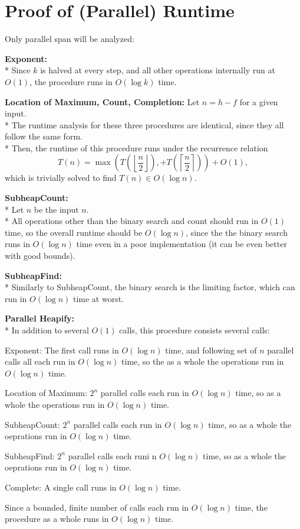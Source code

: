 \documentclass[letterpaper, reqno, 11pt]{article}
\begin{document}
\section*{Proof of (Parallel) Runtime}
Only parallel span will be analyzed:
\begin{description}
	\item{\bf Exponent:}\\*
		Since $k$ is halved at every step, and all other operations internally run at $O(1)$,
		the procedure runs in $O(\log k)$ time.
	\item{\bf Location of Maximum, Count, Completion:}
		Let $n=h-f$ for a given input.\\*
		The runtime analysis for these three procedures are identical,
		since they all follow the same form.\\*
		Then, the runtime of this procedure runs under the recurrence relation
		$$T(n)=\max\left(T\left(\left\lfloor\frac{n}{2}\right\rfloor\right),
		+T\left(\left\lceil\frac{n}{2}\right\rceil\right)\right)+O(1),$$
		which is trivially solved to find $T(n)\in O(\log n)$.
	\item{\bf SubheapCount:}\\*
		Let $n$ be the input $n$.\\*
		All operations other than the binary search and count should run in $O(1)$ time,
		so the overall runtime should be $O(\log n)$,
		since the the binary search runs in $O(\log n)$ time even in a poor implementation
		(it can be even better with good bounds).
	\item{\bf SubheapFind:}\\*
		Similarly to SubheapCount, the binary search is the limiting factor,
		which can run in $O(\log n)$ time at worst.
	\item{\bf Parallel Heapify:}\\*
		In addition to several $O(1)$ calls, this procedure consists several calls:
		\begin{description}
			\item{Exponent:} The first call runs in $O(\log n)$ time,
			and following set of $n$ parallel calls all each run in $O(\log n)$ time,
			so the as a whole the operations run in $O(\log n)$ time.
			\item{Location of Maximum:} $2^n$ parallel calls each run in $O(\log n)$ time,
			so as a whole the operations run in $O(\log n)$ time.
			\item{SubheapCount:} $2^n$ parallel calls each run in $O(\log n)$ time,
			so as a whole the oeprations run in $O(\log n)$ time.
			\item{SubheapFind:} $2^n$ parallel calls each runi n $O(\log n)$ time,
			so as a whole the oeprations run in $O(\log n)$ time.
			\item{Complete:} A single call runs in $O(\log n)$ time.
		\end{description}
		Since a bounded, finite number of calls each run in $O(\log n)$ time,
		the procedure as a whole runs in $O(\log n)$ time.
\end{description}
\end{document}

